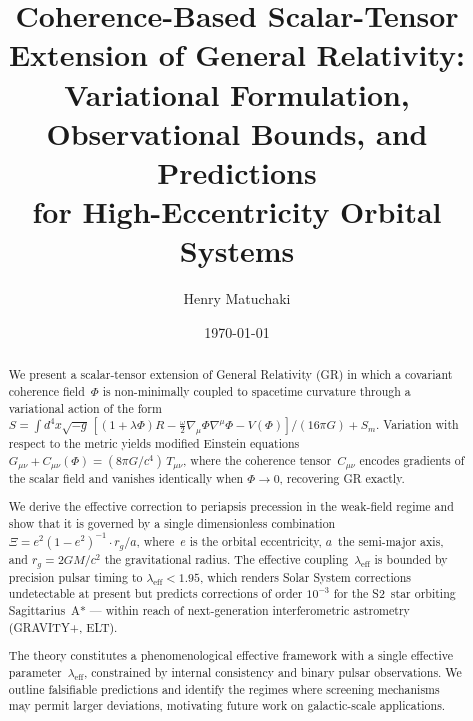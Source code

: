 \documentclass[showpacs,preprintnumbers,amsmath,amssymb,prd,longbibliography]{revtex4-2}
\begin{document}
\title{Coherence-Based Scalar-Tensor Extension of General Relativity:\\
Variational Formulation, Observational Bounds, and Predictions\\
for High-Eccentricity Orbital Systems}

\author{Henry Matuchaki}

\date{\today}

\begin{abstract}
We present a scalar-tensor extension of General Relativity (GR) in which
a covariant coherence field~$\Phi$ is non-minimally coupled to spacetime
curvature through a variational action of the form
$S = \int d^4x\sqrt{-g}\,[(1+\lambda\Phi)R - \tfrac{\omega}{2}\nabla_\mu\Phi\nabla^\mu\Phi - V(\Phi)]/(16\pi G) + S_m$.
Variation with respect to the metric yields modified Einstein equations
$G_{\mu\nu} + C_{\mu\nu}(\Phi) = (8\pi G/c^4)\,T_{\mu\nu}$,
where the coherence tensor~$C_{\mu\nu}$ encodes gradients of
the scalar field and vanishes identically when $\Phi\to 0$,
recovering GR exactly.

We derive the effective correction to periapsis precession in the
weak-field regime and show that it is governed by a single
dimensionless combination $\Xi = e^2(1-e^2)^{-1}\cdot r_g/a$,
where~$e$ is the orbital eccentricity, $a$~the semi-major axis,
and $r_g = 2GM/c^2$ the gravitational radius.
The effective coupling~$\lambda_{\mathrm{eff}}$ is bounded
by precision pulsar timing to $\lambda_{\mathrm{eff}} < 1.95$,
which renders Solar System corrections undetectable at present
but predicts corrections of order $10^{-3}$ for the S2~star
orbiting Sagittarius~A* --- within reach of next-generation
interferometric astrometry (GRAVITY+, ELT).

The theory constitutes a phenomenological effective framework
with a single effective parameter~$\lambda_{\mathrm{eff}}$,
constrained by internal consistency and binary pulsar observations.
We outline falsifiable predictions and identify the regimes
where screening mechanisms may permit larger deviations,
motivating future work on galactic-scale applications.
\end{abstract}

\maketitle

\end{document}
